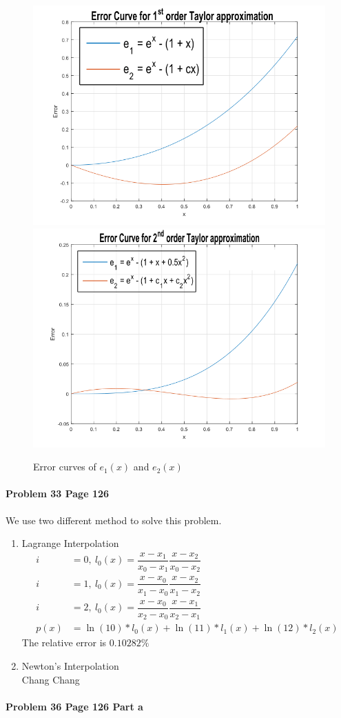 \documentclass[paper=a4, fontsize=11pt]{scrartcl} %
\numberwithin{equation}{section} %
\numberwithin{figure}{section} %
\numberwithin{table}{section} %
\begin{document}
\begin{figure}[h]
\centering
\includegraphics[width=0.49\linewidth]{q5_b.png}
\includegraphics[width=0.49\linewidth]{q5_c.png}
\caption{Error curves of $ e_1(x) $ and $ e_2(x) $}
\label{fig:Q5}
\end{figure}

\newpage
\paragraph{\textbf{Problem 33 Page 126}}
We use two different method to solve this problem.
\begin{enumerate}
	\item Lagrange Interpolation\\
		\begin{align*}
			i&=0,~l_0(x)=\dfrac{x-x_1}{x_0-x_1}\dfrac{x-x_2}{x_0-x_2}\\
			i&=1,~l_0(x)=\dfrac{x-x_0}{x_1-x_0}\dfrac{x-x_2}{x_1-x_2}\\
			i&=2,~l_0(x)=\dfrac{x-x_0}{x_2-x_0}\dfrac{x-x_1}{x_2-x_1}\\
			p(x)&=\ln(10)*l_0(x)	+ \ln(11)*l_1(x)+\ln(12)*l_2(x)
		\end{align*}
		The relative error is $ 0.10282\% $
	
	\item Newton's Interpolation\\
	Chang Chang
\end{enumerate}
\newpage

\paragraph{\textbf{Problem 36 Page 126 Part a}}
\end{document}
